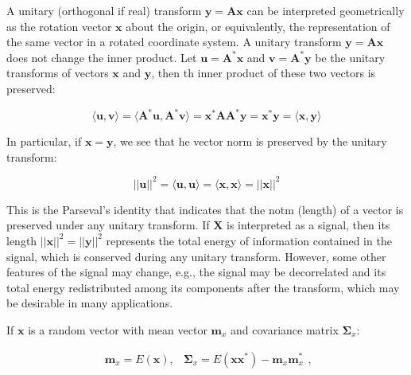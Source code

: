 \documentclass[10pt,b5paper,titlepage]{book}
\begin{document}
\begin{itemize}
        A unitary (orthogonal if real) transform $\mathbf{y} = \mathbf{A} \mathbf{x}$
        can be interpreted geometrically as the rotation vector $\mathbf{x}$
        about the origin, or equivalently, the representation of the same vector
        in a rotated coordinate system. A unitary transform
        $\mathbf{y} = \mathbf{A} \mathbf{x}$ does not change the inner product.
        Let $\mathbf{u} = \mathbf{A}^{*} \mathbf{x}$ and
        $\mathbf{v} = \mathbf{A}^{*} \mathbf{y}$ be the unitary transforms of
        vectors  $\mathbf{x}$ and  $\mathbf{y}$, then th inner product of these
        two vectors is preserved:

        \begin{equation}
            \langle \mathbf{u}, \mathbf{v} \rangle =
            \langle \mathbf{A}^{*} \mathbf{u}, \mathbf{A}^{*} \mathbf{v} \rangle =
            \mathbf{x}^{*} \mathbf{A} \mathbf{A}^{*} \mathbf{y} =
            \mathbf{x}^{*} \mathbf{y} =
            \langle \mathbf{x}, \mathbf{y} \rangle
        \end{equation}

        In particular, if $\mathbf{x} = \mathbf{y}$, we see that he vector norm
        is preserved by the unitary transform:

        \begin{equation}
            ||\mathbf{u}||^{2} = \langle{\mathbf{u}, \mathbf{u}}\rangle
            = \langle{\mathbf{x}, \mathbf{x}}\rangle = ||\mathbf{x}||^{2}
        \end{equation}

        This is the Parseval's identity that indicates that the notm (length)
        of a vector is preserved under any unitary transform. If $\mathbf{X}$
        is interpreted as a signal, then its length
        $||\mathbf{x}||^{2} = ||\mathbf{y}||^{2}$ represents the total energy
        of information contained in the signal, which is conserved during any
        unitary transform. However, some other features of the signal may change,
        e.g., the signal may be decorrelated and its total energy redistributed
        among its components after the transform, which may be desirable in many
        applications.

        If $\mathbf{x}$ is a random vector with mean vector  $\mathbf{m}_x$
        and covariance matrix  $\mathbf{\Sigma}_x$:

        \begin{equation}
            \begin{array}{lr}
                \mathbf{m}_{x} = E(\mathbf{x}), &
                \mathbf{\Sigma}_x = E(\mathbf{x} \mathbf{x}^{*}) - \mathbf{m}_x \mathbf{m}_x^{*}
            \end{array}
        ,\end{equation}


\end{itemize}
\end{document}

